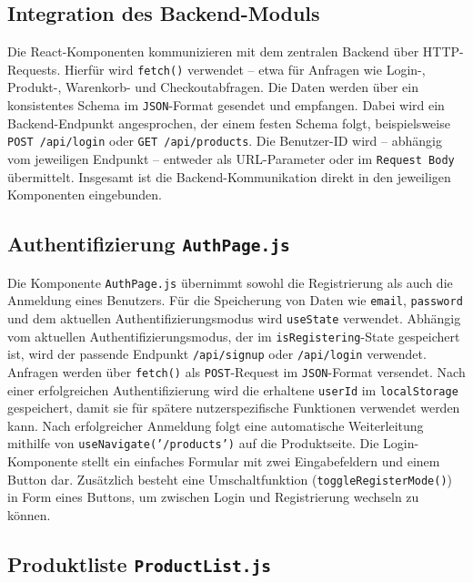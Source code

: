 \documentclass[oneside]{ausarbeitung}
\begin{document}
\subsection{Integration des Backend-Moduls}

Die React-Komponenten kommunizieren mit dem zentralen Backend über \ac{HTTP}-Requests. Hierfür wird \texttt{fetch()} verwendet – etwa für Anfragen wie Login-, Produkt-, Warenkorb- und Checkoutabfragen. Die Daten werden über ein konsistentes Schema im \texttt{JSON}-Format gesendet und empfangen.
Dabei wird ein Backend-Endpunkt angesprochen, der einem festen Schema folgt, beispielsweise \texttt{POST /api/login} oder \texttt{GET /api/products}. Die Benutzer-ID wird – abhängig vom jeweiligen Endpunkt – entweder als URL-Parameter oder im \texttt{Request Body} übermittelt.
Insgesamt ist die Backend-Kommunikation direkt in den jeweiligen Komponenten eingebunden.

\subsection{Authentifizierung \texttt{AuthPage.js}} 

Die Komponente \texttt{AuthPage.js} übernimmt sowohl die Registrierung als auch die Anmeldung eines Benutzers.
Für die Speicherung von Daten wie \texttt{email}, \texttt{password} und dem aktuellen Authentifizierungsmodus wird \texttt{useState} verwendet. Abhängig vom aktuellen Authentifizierungsmodus, der im \texttt{isRegistering}-State gespeichert ist, wird der passende Endpunkt \texttt{/api/signup} oder \texttt{/api/login} verwendet.
Anfragen werden über \texttt{fetch()} als \texttt{POST}-Request im \texttt{JSON}-Format versendet.
Nach einer erfolgreichen Authentifizierung wird die erhaltene \texttt{userId} im \texttt{localStorage} gespeichert, damit sie für spätere nutzerspezifische Funktionen verwendet werden kann. Nach erfolgreicher Anmeldung folgt eine automatische Weiterleitung mithilfe von \texttt{useNavigate('/products')} auf die Produktseite.
Die Login-Komponente stellt ein einfaches Formular mit zwei Eingabefeldern und einem Button dar. Zusätzlich besteht eine Umschaltfunktion (\texttt{toggleRegisterMode()}) in Form eines Buttons, um zwischen Login und Registrierung wechseln zu können.

\subsection{Produktliste \texttt{ProductList.js}} 
\end{document}
